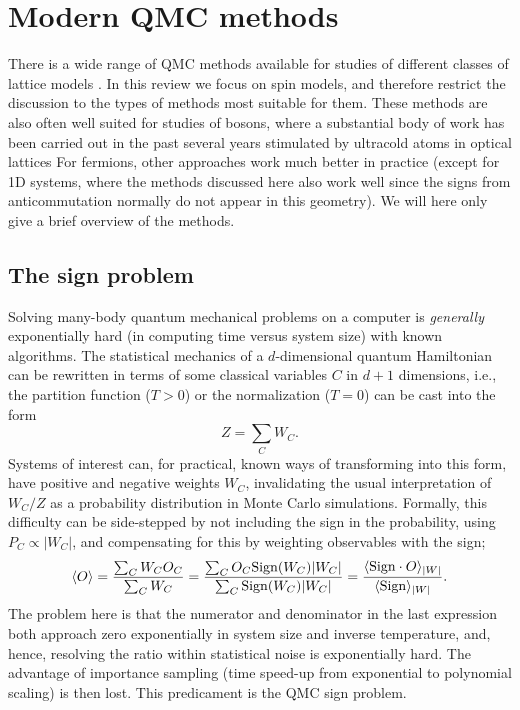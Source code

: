 \documentclass[range]{ar2e}
\begin{document}
\section{Modern QMC methods}
\label{sec:methods}

There is a wide range of QMC methods available for studies of different classes of lattice models \cite{Assaad07,Evertz03,Sandvik10b}. In this review we 
focus on spin models, and therefore restrict the discussion to the types of methods most suitable for them. These methods are also often well suited 
for studies of bosons, where a substantial body of work has been carried out in the past several years stimulated by ultracold atoms in optical 
lattices \cite{Kashurnikov02,Wessel04,Kato08,Pollet10} For fermions, other approaches \cite{Hirsch82,Assaad07} work much better in practice (except 
for 1D systems, where the methods discussed here also work well since the signs from anticommutation normally do not appear in this geometry). We 
will here only give a brief overview of the methods.

\subsection{The sign problem}
\label{ss:sign}

Solving many-body quantum mechanical problems on a computer is {\em generally} exponentially hard (in computing time versus system size) 
with known algorithms. The statistical mechanics of a $d$-dimensional quantum Hamiltonian can be rewritten in terms of some classical variables 
$C$ in $d+1$ dimensions, i.e., the partition function ($T>0$) or the normalization ($T=0$) can be cast into the form
\begin{equation}
\label{eq:wc}
Z=\sum_C W_C.
\end{equation}
Systems of interest can, for practical, known ways of transforming into this form, have positive and negative weights $W_C$, 
invalidating the usual interpretation of $W_C/Z$ as a probability distribution in Monte Carlo simulations. Formally, this difficulty 
can be side-stepped by not including the sign in the probability, using $P_C \propto |W_C|$, and compensating for this by weighting 
observables with the sign;
\begin{equation}
\langle O \rangle = \frac{\sum_C W_C O_C}{\sum_C W_C} =
\frac{\sum_C O_C {\rm Sign}(W_C) |W_C|}{\sum_C {\rm Sign}(W_C)|W_C|} = 
\frac{\langle {\rm Sign} \cdot O\rangle_{|W|}}{\langle {\rm Sign}\rangle_{|W|}}.
\label{expvalue}
\end{equation}
The problem here is that the numerator and denominator in the last expression both approach zero
exponentially in system size and inverse temperature, and, hence, resolving the ratio within 
statistical noise is exponentially hard. The advantage of importance sampling (time speed-up 
from exponential to polynomial scaling) is then lost. This predicament is the QMC sign problem.
\end{document}

